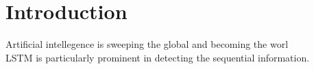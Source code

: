 \section{Introduction}
Artificial intellegence is sweeping the global and becoming the worl
\\
LSTM is particularly prominent in detecting the sequential information. 